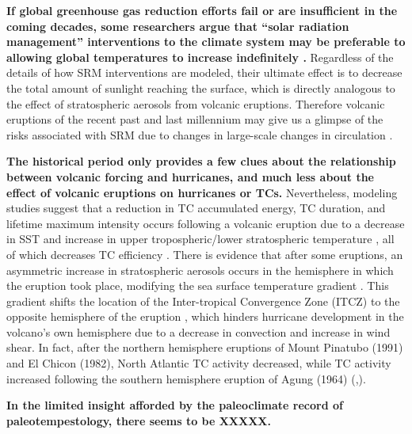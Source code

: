 \documentclass[smallextended]{svjour3}       %
\begin{document}
\textbf{If global greenhouse gas reduction efforts fail or are
  insufficient in the coming decades, some researchers argue that
  ``solar radiation management'' interventions to the climate system
  may be preferable to allowing global temperatures to increase
  indefinitely \cite{REF,REF,REF}.} %
  Regardless of the
details of how SRM interventions are modeled, their ultimate effect is
to decrease the total amount of sunlight reaching the surface, which
is directly analogous to the effect of stratospheric aerosols from
volcanic eruptions. Therefore volcanic eruptions of the recent past
and last millennium may give us a glimpse of the risks associated with
SRM due to changes in large-scale changes in circulation \cite{REF}.


\textbf{The historical period only provides a few clues about the
  relationship between volcanic forcing and hurricanes, and much less
  about the effect of volcanic eruptions on hurricanes or TCs.}
Nevertheless, modeling studies suggest that a reduction in TC
accumulated energy, TC duration, and lifetime maximum intensity occurs
following a volcanic eruption due to a decrease in SST and increase in
upper tropospheric/lower stratospheric temperature \cite{volc_hurrs2},
all of which decreases TC efficiency \cite{trop_cool}.  There is
evidence that after some eruptions, an asymmetric increase in
stratospheric aerosols occurs in the hemisphere in which the eruption
took place, modifying the sea surface temperature gradient
\cite{asym_forcing}.  This gradient shifts the location of the
Inter-tropical Convergence Zone (ITCZ) to the opposite hemisphere of
the eruption \cite{asym_forcing}, which hinders hurricane development
in the volcano’s own hemisphere due to a decrease in convection and
increase in wind shear.  In fact, after the northern hemisphere
eruptions of Mount Pinatubo (1991) and El Chicon (1982), North
Atlantic TC activity decreased, while TC activity increased following
the southern hemisphere eruption of Agung (1964)
(\cite{volc_hurrs3},\cite{volc_hurrs2}).

\textbf{In the limited insight afforded by the paleoclimate record of
paleotempestology, there seems to be XXXXX.}%
\end{document}
